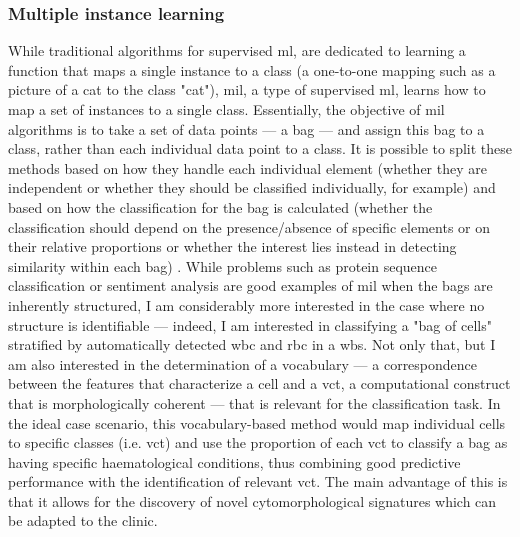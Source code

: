 \begin{figure}[!ht]
    \label{fig:u-map-condition-density}
\end{figure}

\subsubsection{Multiple instance learning}

While traditional algorithms for supervised \ac{ml}, are dedicated to learning a function that maps a single instance to a class (a one-to-one mapping such as a picture of a cat to the class "cat"), \ac{mil}, a type of supervised \ac{ml}, learns how to map a set of instances to a single class. Essentially, the objective of \ac{mil} algorithms is to take a set of data points --- a bag --- and assign this bag to a class, rather than each individual data point to a class. It is possible to split these methods based on how they handle each individual element (whether they are independent or whether they should be classified individually, for example) and based on how the classification for the bag is calculated (whether the classification should depend on the presence/absence of specific elements or on their relative proportions or whether the interest lies instead in detecting similarity within each bag) \cite{Amores2013-ym,Carbonneau2016-xc}. While problems such as protein sequence classification or sentiment analysis are good examples of \ac{mil} when the bags are inherently structured, I am considerably more interested in the case where no structure is identifiable --- indeed, I am interested in classifying a "bag of cells" stratified by automatically detected \ac{wbc} and \ac{rbc} in a \ac{wbs}. Not only that, but I am also interested in the determination of a vocabulary --- a correspondence between the features that characterize a cell and a \ac{vct}, a computational construct that is morphologically coherent --- that is relevant for the classification task. In the ideal case scenario, this vocabulary-based method would map individual cells to specific classes (i.e. \ac{vct}) and use the proportion of each \ac{vct} to classify a bag as having specific haematological conditions, thus combining good predictive performance with the identification of relevant \ac{vct}. The main advantage of this is that it allows for the discovery of novel cytomorphological signatures which can be adapted to the clinic.

